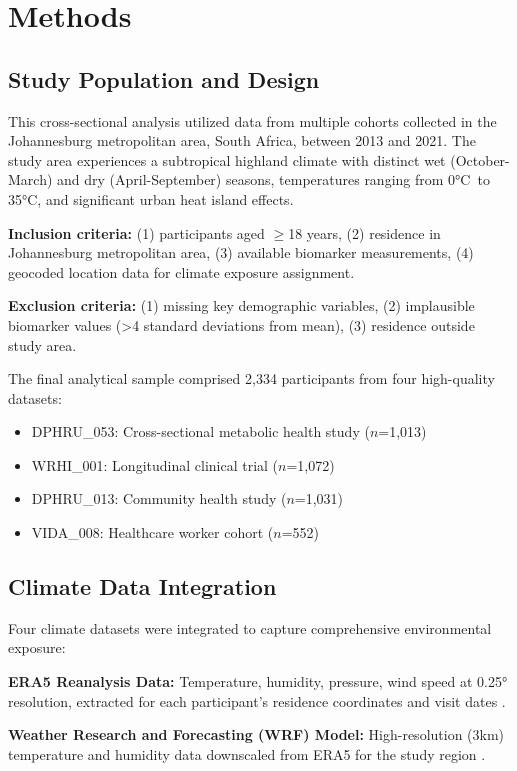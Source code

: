 \documentclass[11pt,a4paper]{article}
\newcommand{\degrees}{°C}
\begin{document}
\section{Methods}

\subsection{Study Population and Design}

This cross-sectional analysis utilized data from multiple cohorts collected in the Johannesburg metropolitan area, South Africa, between 2013 and 2021. The study area experiences a subtropical highland climate with distinct wet (October-March) and dry (April-September) seasons, temperatures ranging from 0\degrees\ to 35\degrees, and significant urban heat island effects.

\textbf{Inclusion criteria:} (1) participants aged $\geq$18 years, (2) residence in Johannesburg metropolitan area, (3) available biomarker measurements, (4) geocoded location data for climate exposure assignment. 

\textbf{Exclusion criteria:} (1) missing key demographic variables, (2) implausible biomarker values (>4 standard deviations from mean), (3) residence outside study area.

The final analytical sample comprised 2,334 participants from four high-quality datasets:
\begin{itemize}
\item DPHRU\_053: Cross-sectional metabolic health study ($n$=1,013)
\item WRHI\_001: Longitudinal clinical trial ($n$=1,072) 
\item DPHRU\_013: Community health study ($n$=1,031)
\item VIDA\_008: Healthcare worker cohort ($n$=552)
\end{itemize}

\subsection{Climate Data Integration}

Four climate datasets were integrated to capture comprehensive environmental exposure:

\textbf{ERA5 Reanalysis Data:} Temperature, humidity, pressure, wind speed at 0.25° resolution, extracted for each participant's residence coordinates and visit dates \cite{hersbach2020era5}.

\textbf{Weather Research and Forecasting (WRF) Model:} High-resolution (3km) temperature and humidity data downscaled from ERA5 for the study region \cite{skamarock2008wrf}.
\end{document}
